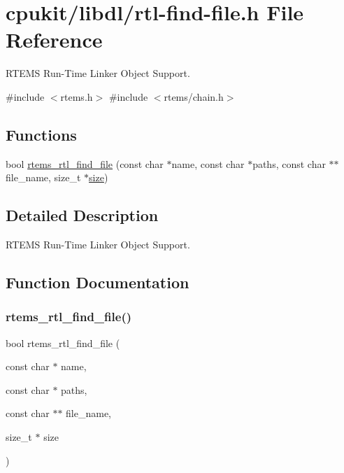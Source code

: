 \hypertarget{rtl-find-file_8h}{}\section{cpukit/libdl/rtl-\/find-\/file.h File Reference}
\label{rtl-find-file_8h}


R\+T\+E\+MS Run-\/\+Time Linker Object Support.  


{\ttfamily \#include $<$rtems.\+h$>$}\newline
{\ttfamily \#include $<$rtems/chain.\+h$>$}\newline
\subsection*{Functions}
\begin{DoxyCompactItemize}
\item 
bool \mbox{\hyperlink{rtl-find-file_8h_ad8ca11014a45cd487b4a0562388bbed3}{rtems\+\_\+rtl\+\_\+find\+\_\+file}} (const char $\ast$name, const char $\ast$paths, const char $\ast$$\ast$file\+\_\+name, size\+\_\+t $\ast$\mbox{\hyperlink{sun4u_2tte_8h_a245260f6f74972558f61b85227df5aae}{size}})
\end{DoxyCompactItemize}


\subsection{Detailed Description}
R\+T\+E\+MS Run-\/\+Time Linker Object Support. 



\subsection{Function Documentation}
\mbox{\label{rtl-find-file_8h_ad8ca11014a45cd487b4a0562388bbed3}} 
\subsubsection{\texorpdfstring{rtems\_rtl\_find\_file()}{rtems\_rtl\_find\_file()}}
{\footnotesize\ttfamily bool rtems\+\_\+rtl\+\_\+find\+\_\+file (\begin{DoxyParamCaption}\item[{const char $\ast$}]{name,  }\item[{const char $\ast$}]{paths,  }\item[{const char $\ast$$\ast$}]{file\+\_\+name,  }\item[{size\+\_\+t $\ast$}]{size }\end{DoxyParamCaption})}


